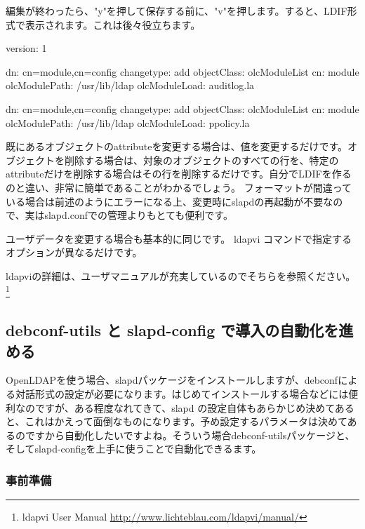 \documentclass[mingoth,a4paper]{jsarticle}
\begin{document}
編集が終わったら、"y"を押して保存する前に、"v"を押します。すると、LDIF形式で表示されます。これは後々役立ちます。

\begin{commandline}
version: 1

dn: cn=module,cn=config
changetype: add
objectClass: olcModuleList
cn: module
olcModulePath: /usr/lib/ldap
olcModuleLoad: auditlog.la

dn: cn=module,cn=config
changetype: add
objectClass: olcModuleList
cn: module
olcModulePath: /usr/lib/ldap
olcModuleLoad: ppolicy.la
\end{commandline}

既にあるオブジェクトのattributeを変更する場合は、値を変更するだけです。オブジェクトを削除する場合は、対象のオブジェクトのすべての行を、特定のattributeだけを削除する場合はその行を削除するだけです。自分でLDIFを作るのと違い、非常に簡単であることがわかるでしょう。
フォーマットが間違っている場合は前述のようにエラーになる上、変更時にslapdの再起動が不要なので、実はslapd.confでの管理よりもとても便利です。

ユーザデータを変更する場合も基本的に同じです。 ldapvi コマンドで指定するオプションが異なるだけです。


ldapviの詳細は、ユーザマニュアルが充実しているのでそちらを参照ください。\footnote{ldapvi User Manual \url{http://www.lichteblau.com/ldapvi/manual/}}

\subsection{debconf-utils と slapd-config で導入の自動化を進める}

OpenLDAPを使う場合、slapdパッケージをインストールしますが、debconfによる対話形式の設定が必要になります。はじめてインストールする場合などには便利なのですが、ある程度なれてきて、slapd の設定自体もあらかじめ決めてあると、これはかえって面倒なものになります。予め設定するパラメータは決めてあるのですから自動化したいですよね。そういう場合debconf-utilsパッケージと、 そしてslapd-configを上手に使うことで自動化できるます。

\subsubsection{事前準備}
\end{document}
